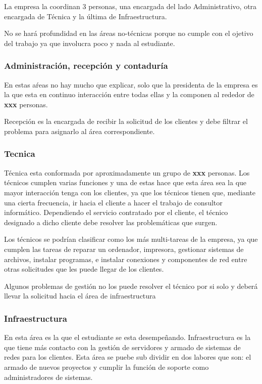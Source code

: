 \documentclass[12pt,a4paper]{article}
\begin{document}
La empresa la coordinan 3 personas, una encargada del lado Administrativo, otra encargada de Técnica y la última de Infraestructura.

No se hará profundidad en las áreas no-técnicas porque no cumple con el ojetivo del trabajo ya que involucra poco y nada al estudiante.

\subsubsection{Administración, recepción y contaduría}
En estas aŕeas no hay mucho que explicar, solo que la presidenta de la empresa es la que esta en continuo interacción entre todas ellas y la componen al rededor de \textbf{xxx} personas.

Recepción es la encargada de recibir la solicitud de los clientes y debe filtrar el problema para asignarlo al área correspondiente. 

\subsubsection{Tecnica}
Técnica esta conformada por aproximadamente un grupo de \textbf{xxx} personas. Los técnicos cumplen varias funciones y una de estas hace que esta área sea la que mayor interacción tenga con los clientes, ya que los técnicos tienen que, mediante una cierta frecuencia, ir hacia el cliente a hacer el trabajo de consultor informático. Dependiendo el servicio contratado por el cliente, el técnico designado a dicho cliente debe resolver las problemáticas que surgen.

Los técnicos se podrían clasificar como los más multi-tareas de la empresa, ya que cumplen las tareas de reparar un ordenador, impresora, gestionar sistemas de archivos, instalar programas, e instalar conexiones y componentes de red entre otras solicitudes que les puede llegar de los clientes.

Algunos problemas de gestión no los puede resolver el técnico por si solo y deberá llevar la solicitud hacia el área de infraestructura

\subsubsection{Infraestructura}
En esta área es la que el estudiante se esta desempeñando. Infraestructura es la que tiene más contacto con la gestión de servidores y armado de sistemas de redes para los clientes. Esta área se puebe sub dividir en dos labores que son: el armado de nuevos proyectos y cumplir la función de soporte como administradores de sistemas. 
\end{document}
